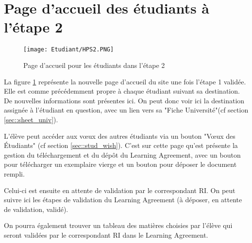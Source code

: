 \section{Page d'accueil des étudiants à l'étape 2}



\begin{figure}[H]
	\texttt{[image: Etudiant/HPS2.PNG]}
	\caption{Page d'accueil pour les étudiants dans l'étape 2}
	\label{fig::hps2}
\end{figure}


La figure \ref{fig::hps2} représente la nouvelle page d'accueil du site une fois l'étape 1 validée.
Elle est comme précédemment propre à chaque étudiant suivant sa destination. De nouvelles informations sont présentes ici.
On peut donc voir ici la destination assignée à l'étudiant en question, avec un lien vers sa "Fiche Université"(cf section \ref{sec::sheet_univ}).

L'élève peut accéder aux vœux des autres étudiants via un bouton "Vœux des Étudiants" (cf section \ref{sec::stud_wish}).
C'est sur cette page qu'est présente la gestion du téléchargement et du dépôt du Learning Agreement, avec un bouton pour télécharger un exemplaire vierge et un bouton pour déposer le document rempli.

Celui-ci est ensuite en attente de validation par le correspondant RI. On peut suivre ici les étapes de validation du Learning Agreement (à déposer, en attente de validation, validé).


\bigbreak

On pourra également trouver un tableau des matières choisies par l'élève qui seront validées par le correspondant RI dans le Learning Agreement.


